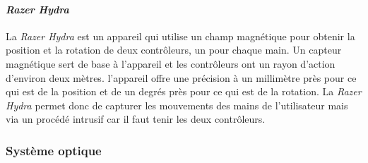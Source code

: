 \paragraph{\emph{Razer Hydra}}
La \emph{Razer Hydra} \cite{ku12} est un appareil qui utilise un champ magnétique pour obtenir la position et la rotation de deux contrôleurs, un pour chaque main. Un capteur magnétique sert de base à l'appareil et les contrôleurs ont un rayon d'action d'environ deux mètres. l'appareil offre une précision à un millimètre près pour ce qui est de la position et de un degrés près pour ce qui est de la rotation. La \emph{Razer Hydra} permet donc de capturer les mouvements des mains de l'utilisateur mais via un procédé intrusif car il faut tenir les deux contrôleurs.

\subsubsection{Système optique}

